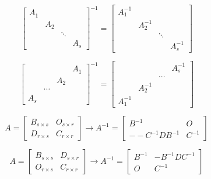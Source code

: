 \begin{corollary}[分块矩阵逆矩阵]
	
	$$\begin{bmatrix}
		A_{1} &       &        &\\
		      & A_{2} &        &\\
			  &	      & \ddots &\\
			  &       &        & A_{s}
	  \end{bmatrix}^{-1} = 
	  \begin{bmatrix}
		A_{1}^{-1} &            &        &\\
		           & A_{2}^{-1} &        &\\
				   &	        & \ddots &\\
				   &            &        & A_{s}^{-1}
	  \end{bmatrix}$$

	  $$\begin{bmatrix}
		      &        &       & A_{1}\\
		      &        & A_{2} &\\
			  &	\cdots &       &\\
		A_{s} &        &       &
	  \end{bmatrix}^{-1} = 
	  \begin{bmatrix}
			       &            &        & A_{s}^{-1}\\
			       &            & \cdots &\\
			       & A_{2}^{-1} &        &\\
		A_{1}^{-1} &            &        &
	\end{bmatrix}$$

	$$A = \begin{bmatrix}
		B_{s\times s} & O_{s\times r}\\
		D_{r\times s} & C_{r\times r}
	  \end{bmatrix}\to 
	  A^{-1} = \begin{bmatrix}
		B^{-1}          & O\\
		--C^{-1}DB^{-1} & C^{-1}
	  \end{bmatrix}$$

	$$A = \begin{bmatrix}
		B_{s\times s} & D_{s\times r}\\
		O_{r\times s} & C_{r\times r}
	  \end{bmatrix}\to 
	  A^{-1} = \begin{bmatrix}
		B^{-1} & -B^{-1}DC^{-1}\\
		O      & C^{-1}
	  \end{bmatrix}$$


\end{corollary}
